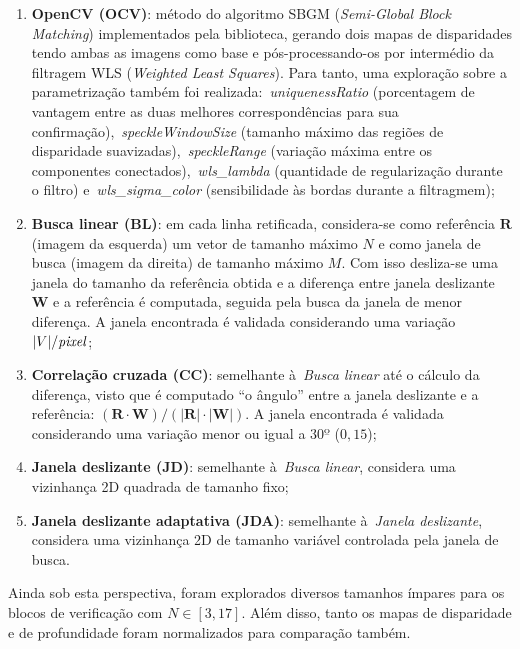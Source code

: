 \begin{enumerate}
    \item \textbf{OpenCV (OCV)}: método do algoritmo SBGM (\emph{Semi-Global Block Matching}) implementados pela biblioteca, gerando dois mapas de disparidades tendo ambas as imagens como base e pós-processando-os por intermédio da filtragem WLS (\emph{Weighted Least Squares}). Para tanto, uma exploração sobre a parametrização também foi realizada:~\emph{uniquenessRatio} (porcentagem de vantagem entre as duas melhores correspondências para sua confirmação),~\emph{speckleWindowSize} (tamanho máximo das regiões de disparidade suavizadas),~\emph{speckleRange} (variação máxima entre os componentes conectados),~\emph{wls\_lambda} (quantidade de regularização durante o filtro) e~\emph{wls\_sigma\_color} (sensibilidade às bordas durante a filtragmem);
    \item \textbf{Busca linear (BL)}: em cada linha retificada, considera-se como referência $\mathbf{R}$ (imagem da esquerda) um vetor de tamanho máximo $N$ e como janela de busca (imagem da direita) de tamanho máximo $M$. Com isso desliza-se uma janela do tamanho da referência obtida e a diferença entre janela deslizante $\mathbf{W}$ e a referência é computada, seguida pela busca da janela de menor diferença. A janela encontrada é validada considerando uma variação $|V|/\text{\emph{pixel}}$;
    \item \textbf{Correlação cruzada (CC)}: semelhante à~\emph{Busca linear} até o cálculo da diferença, visto que é computado ``o ângulo'' entre a janela deslizante e a referência: $(\mathbf{R} \cdot \mathbf{W})/(|\mathbf{R}| \cdot |\mathbf{W}|)$. A janela encontrada é validada considerando uma variação menor ou igual a $30º$ ($0,15$);
    \item \textbf{Janela deslizante (JD)}: semelhante à~\emph{Busca linear}, considera uma vizinhança 2D quadrada de tamanho fixo;
    \item \textbf{Janela deslizante adaptativa (JDA)}: semelhante à~\emph{Janela deslizante}, considera uma vizinhança 2D de tamanho variável controlada pela janela de busca.
\end{enumerate}

Ainda sob esta perspectiva, foram explorados diversos tamanhos ímpares para os blocos de verificação com $N \in [3, 17]$. Além disso, tanto os mapas de disparidade e de profundidade foram normalizados para comparação também.